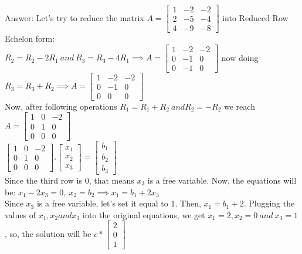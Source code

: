 \documentclass{article}%
\begin{document}
\begin{enumerate}
    Answer: Let's try to reduce the matrix $ A = \begin{bmatrix} 1 & -2 & -2 \\ 2 & -5 &  -4 \\ 4 & -9 & -8 \end{bmatrix} $ into Reduced Row Echelon form: \\
    $R_2 = R_2 - 2R_1 \ and \ R_3 = R_3 - 4R_1 \implies A = \begin{bmatrix} 1 & -2 & -2 \\ 0 & -1 & 0 \\ 0 & -1 & 0 \end{bmatrix}$ now doing $ R_3 = R_3 + R_2 \implies A = \begin{bmatrix} 1 & -2 & -2 \\ 0 & -1 & 0 \\ 0 & 0 & 0 \end{bmatrix} $ \\
    Now, after following operations $ R_1 = R_1 + R_2 \ and R_2 = -R_2 $ we reach $A = \begin{bmatrix} 1 & 0 & -2 \\ 0 & 1 & 0 \\ 0 & 0 & 0 \end{bmatrix}$ \\
    $ \begin{bmatrix} 1 & 0 & -2 \\ 0 & 1 & 0 \\ 0 & 0 & 0 \end{bmatrix} . \begin{bmatrix} x_1 \\ x_2 \\ x_3 \end{bmatrix} = \begin{bmatrix} b_1 \\ b_2 \\ b_3 \end{bmatrix}$ \\
    Since the third row is 0, that means $x_3$ is a free variable. Now, the equations will be: $x_1 - 2x_3 = 0, \ x_2 = b_2 \implies x_1 = b_1 + 2x_3 $ \\
    Since $ x_3 $ is a free variable, let's set it equal to 1. Then, $x_1 = b_1 + 2$. Plugging the values of $x_1, x_2 and x_3$ into the original equations, we get $x_1 = 2, x_2 = 0 \ and \ x_3 = 1$ , so, the solution will be $ c * \begin{bmatrix} 2 \\ 0 \\ 1 \end{bmatrix} $ \\

\end{enumerate}
\end{document}
